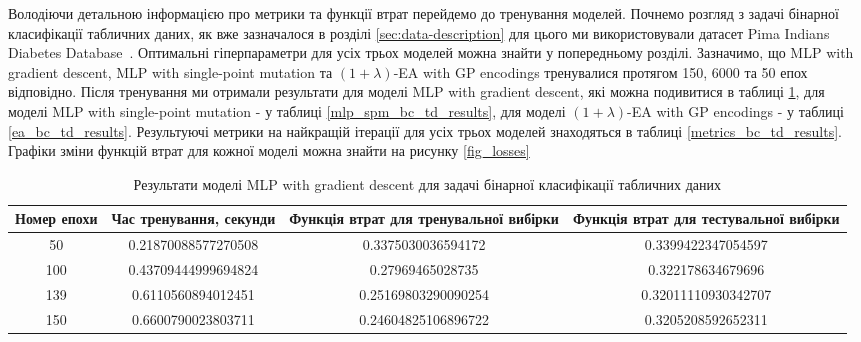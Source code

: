 Володіючи детальною інформацією про метрики та функції втрат перейдемо до тренування моделей. Почнемо розгляд з задачі бінарної класифікації табличних даних, як вже зазначалося в розділі \ref{sec:data-description} для цього ми використовували датасет Pima Indians Diabetes Database~\cite{ct30}. Оптимальні гіперпараметри для усіх трьох моделей можна знайти у попередньому розділі. Зазначимо, що MLP with gradient descent, MLP with single-point mutation та $(1+\lambda)$-EA with GP encodings тренувалися протягом 150, 6000 та 50 епох відповідно. Після тренування ми отримали результати для моделі MLP with gradient descent, які можна подивитися в таблиці \ref{mlp_gd_bc_td_results}, для моделі MLP with single-point mutation - у таблиці \ref{mlp_spm_bc_td_results}, для моделі $(1+\lambda)$-EA with GP encodings - у таблиці \ref{ea_bc_td_results}. Результуючі метрики на найкращій ітерації для усіх трьох моделей знаходяться в таблиці \ref{metrics_bc_td_results}. Графіки зміни функцій втрат для кожної моделі можна знайти на рисунку \ref{fig_losses}

\begin{table}[ht]
	\caption{Результати моделі MLP with gradient descent для задачі бінарної класифікації табличних даних}
	\label{mlp_gd_bc_td_results}
	\centering
	\begin{adjustbox}{max width=\textwidth}
		\begin{tabular}{|c|c|c|c|}
			\hline 
			Номер епохи & Час тренування, секунди & Функція втрат для тренувальної вибірки & Функція втрат для тестувальної вибірки \\
			\hline 
			50 & 0.21870088577270508 & 0.3375030036594172 & 0.3399422347054597 \\
			\hline 
			100 & 0.43709444999694824 & 0.27969465028735 & 0.322178634679696 \\
			\hline
			139 & 0.6110560894012451 & 0.25169803290090254 & 0.32011110930342707 \\
			\hline
			150 & 0.6600790023803711 & 0.24604825106896722 & 0.3205208592652311 \\
			\hline
		\end{tabular}
	\end{adjustbox}
\end{table}

